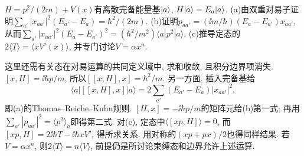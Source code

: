 \begin{exercise}
$H=p^2/(2m)+V(x)$有离散完备能量基$\lvert a\rangle$, $H\lvert a\rangle=E_a\lvert a\rangle$. (a)由双重对易子证明$\sum_{a'}|x_{aa'}|^2(E_{a'}-E_a)=\hbar^2/(2m)$. (b)证明$p_{aa'}=(\ii m/\hbar)(E_a-E_{a'})x_{aa'}$, 从而$\sum_{a'}|x_{aa'}|^2(E_a-E_{a'})^2=(\hbar^2/m^2)\langle a|p^2|a\rangle$. (c)推导定态的$2\langle T\rangle=\langle xV'(x)\rangle$, 并专门讨论$V=\alpha x^n$.
\end{exercise}
\begin{solution}
这里还需有关态在对易运算的共同定义域中, 求和收敛, 且积分边界项消失. $[x,H]=\ii\hbar p/m$, 所以$[[x,H],x]=\hbar^2/m$. 另一方面, 插入完备基给
\[
\langle a|[[x,H],x]|a\rangle=2\sum_{a'}(E_{a'}-E_a)|x_{aa'}|^2,
\]
即(a)的Thomas--Reiche--Kuhn规则. $[H,x]=-\ii\hbar p/m$的矩阵元给(b)第一式; 再用$\sum_{a'}|p_{aa'}|^2=\langle p^2\rangle_a$即得第二式. 对(c), 定态中$\langle[xp,H]\rangle=0$, 而$[xp,H]=2\ii\hbar T-\ii\hbar xV'$, 得所求关系. 用对称的$(xp+px)/2$也得同样结果. 若$V=\alpha x^n$, 则$2\langle T\rangle=n\langle V\rangle$, 前提仍是所讨论束缚态和边界允许上述运算.
\end{solution}

